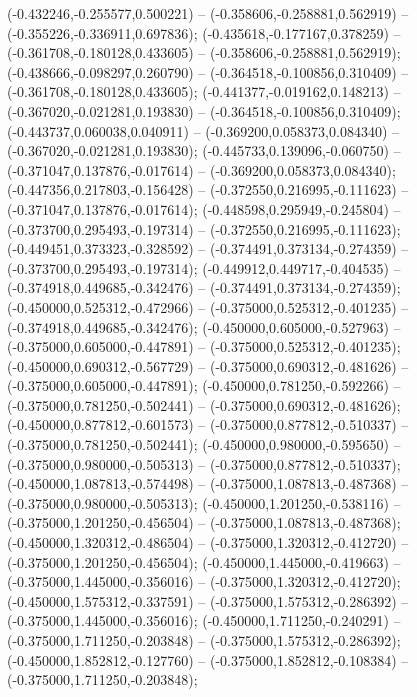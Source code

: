  (-0.432246,-0.255577,0.500221) -- (-0.358606,-0.258881,0.562919) -- (-0.355226,-0.336911,0.697836);
 (-0.435618,-0.177167,0.378259) -- (-0.361708,-0.180128,0.433605) -- (-0.358606,-0.258881,0.562919);
 (-0.438666,-0.098297,0.260790) -- (-0.364518,-0.100856,0.310409) -- (-0.361708,-0.180128,0.433605);
 (-0.441377,-0.019162,0.148213) -- (-0.367020,-0.021281,0.193830) -- (-0.364518,-0.100856,0.310409);
 (-0.443737,0.060038,0.040911) -- (-0.369200,0.058373,0.084340) -- (-0.367020,-0.021281,0.193830);
 (-0.445733,0.139096,-0.060750) -- (-0.371047,0.137876,-0.017614) -- (-0.369200,0.058373,0.084340);
 (-0.447356,0.217803,-0.156428) -- (-0.372550,0.216995,-0.111623) -- (-0.371047,0.137876,-0.017614);
 (-0.448598,0.295949,-0.245804) -- (-0.373700,0.295493,-0.197314) -- (-0.372550,0.216995,-0.111623);
 (-0.449451,0.373323,-0.328592) -- (-0.374491,0.373134,-0.274359) -- (-0.373700,0.295493,-0.197314);
 (-0.449912,0.449717,-0.404535) -- (-0.374918,0.449685,-0.342476) -- (-0.374491,0.373134,-0.274359);
 (-0.450000,0.525312,-0.472966) -- (-0.375000,0.525312,-0.401235) -- (-0.374918,0.449685,-0.342476);
 (-0.450000,0.605000,-0.527963) -- (-0.375000,0.605000,-0.447891) -- (-0.375000,0.525312,-0.401235);
 (-0.450000,0.690312,-0.567729) -- (-0.375000,0.690312,-0.481626) -- (-0.375000,0.605000,-0.447891);
 (-0.450000,0.781250,-0.592266) -- (-0.375000,0.781250,-0.502441) -- (-0.375000,0.690312,-0.481626);
 (-0.450000,0.877812,-0.601573) -- (-0.375000,0.877812,-0.510337) -- (-0.375000,0.781250,-0.502441);
 (-0.450000,0.980000,-0.595650) -- (-0.375000,0.980000,-0.505313) -- (-0.375000,0.877812,-0.510337);
 (-0.450000,1.087813,-0.574498) -- (-0.375000,1.087813,-0.487368) -- (-0.375000,0.980000,-0.505313);
 (-0.450000,1.201250,-0.538116) -- (-0.375000,1.201250,-0.456504) -- (-0.375000,1.087813,-0.487368);
 (-0.450000,1.320312,-0.486504) -- (-0.375000,1.320312,-0.412720) -- (-0.375000,1.201250,-0.456504);
 (-0.450000,1.445000,-0.419663) -- (-0.375000,1.445000,-0.356016) -- (-0.375000,1.320312,-0.412720);
 (-0.450000,1.575312,-0.337591) -- (-0.375000,1.575312,-0.286392) -- (-0.375000,1.445000,-0.356016);
 (-0.450000,1.711250,-0.240291) -- (-0.375000,1.711250,-0.203848) -- (-0.375000,1.575312,-0.286392);
 (-0.450000,1.852812,-0.127760) -- (-0.375000,1.852812,-0.108384) -- (-0.375000,1.711250,-0.203848);
